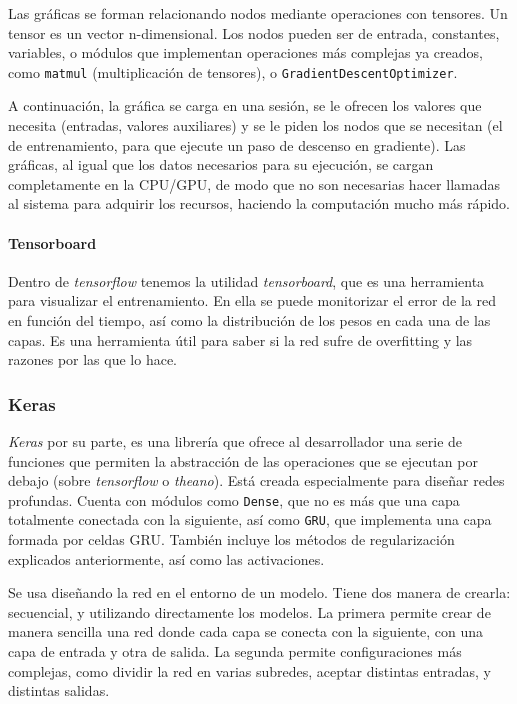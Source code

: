 Las gráficas se forman relacionando nodos mediante operaciones con tensores. Un tensor es un vector n-dimensional. Los nodos pueden ser de entrada, constantes, variables, o módulos que implementan operaciones más complejas ya creados, como \texttt{matmul} (multiplicación de tensores), o \texttt{Gradient\-Descent\-Optimizer}.

A continuación, la gráfica se carga en una sesión, se le ofrecen los valores que necesita (entradas, valores auxiliares) y se le piden los nodos que se necesitan (el de entrenamiento, para que ejecute un paso de descenso en gradiente). Las gráficas, al igual que los datos necesarios para su ejecución, se cargan completamente en la CPU/GPU, de modo que no son necesarias hacer llamadas al sistema para adquirir los recursos, haciendo la computación mucho más rápido.
\paragraph{Tensorboard}
Dentro de \textit{tensorflow} tenemos la utilidad \textit{tensorboard}, que es una herramienta para visualizar el entrenamiento. En ella se puede monitorizar el error de la red en función del tiempo, así como la distribución de los pesos en cada una de las capas. Es una herramienta útil para saber si la red sufre de overfitting y las razones por las que lo hace.

\subsubsection{Keras}
\textit{Keras} por su parte, es una librería que ofrece al desarrollador una serie de funciones que permiten la abstracción de las operaciones que se ejecutan por debajo (sobre \textit{tensorflow} o \textit{theano}). Está creada especialmente para diseñar redes profundas. Cuenta con módulos como \texttt{Dense}, que no es más que una capa totalmente conectada con la siguiente, así como \texttt{GRU}, que implementa una capa formada por celdas GRU. También incluye los métodos de regularización explicados anteriormente, así como las activaciones.

Se usa diseñando la red en el entorno de un modelo. Tiene dos manera de crearla: secuencial, y utilizando directamente los modelos. La primera permite crear de manera sencilla una red donde cada capa se conecta con la siguiente, con una capa de entrada y otra de salida. La segunda permite configuraciones más complejas, como dividir la red en varias subredes, aceptar distintas entradas, y distintas salidas.

